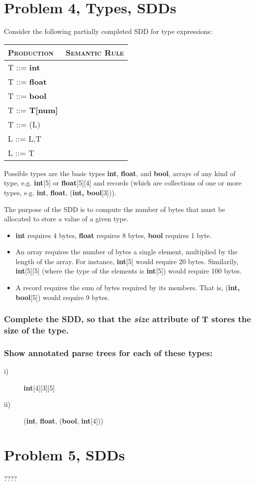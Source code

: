 \newpage
\setcounter{subsubsection}{0}
\section{Problem 4, Types, SDDs}
Consider the following partially completed SDD for type expressions:
\begin{table}[H]
\begin{tabular}{ll}
	\textsc{Production} & \textsc{Semantic Rule} \\ \hline
	T ::= \textbf{int}	&						\\
	T ::= \textbf{float}& \\
	T ::= \textbf{bool} & \\
	T ::= \textbf{T[num]}& \\
	T ::= (L) 			& \\
	L ::= L,T			& \\
	L ::= T				& \\
\end{tabular}
\end{table}

Possible types are the basic types \textbf{int}, \textbf{float}, and \textbf{bool}, arrays of any kind of type, e.g. \textbf{int}[5] or \textbf{float}[5][4] and records (which are collections of one or more types, e.g. \textbf{int}, \textbf{float}, (\textbf{int, bool}[3])).

The purpose of the SDD is to compute the number of bytes that must be allocated to store a value of a given type.
\begin{itemize}
	\item \textbf{int} requires 4 bytes, \textbf{float} requires 8 bytes, \textbf{bool} requires 1 byte.
	\item An array requires the number of bytes a single element, multiplied by the length of the array. For instance, \textbf{int}[5] would require 20 bytes. Similarily, \textbf{int}[5][5] (where the type of the elements is \textbf{int}[5]) would require 100 bytes.
	\item A record requires the sum of bytes required by its members. That is, (\textbf{int, bool}[5]) would require 9 bytes.
\end{itemize}

\subsubsection{Complete the SDD, so that the \textit{size} attribute of T stores the size of the type.}

\subsubsection{Show annotated parse trees for each of these types:}
\begin{description}
	\item[i)] \textbf{int}[4][3][5]
	\item[ii)] (\textbf{int}, \textbf{float}, (\textbf{bool}, \textbf{int}[4]))

\end{description}

\newpage
\section{Problem 5, SDDs}
????
